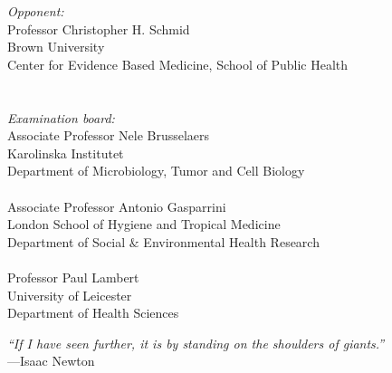\documentclass[11pt,a4paper,twoside,openany]{book}\usepackage{knitr}
\makeatletter
\def\cleardoublepage{\clearpage\if@twoside
\ifodd\c@page
\else\hbox{}\thispagestyle{empty}\newpage
\if@twocolumn\hbox{}\newpage\fi\fi\fi}
\makeatother
\begin{document}
\begin{minipage}[t]{7.25cm}
\singlespacing
{\small
\textit{Opponent:}\\
Professor Christopher H. Schmid \\
Brown University \\
Center for Evidence Based Medicine, School of Public Health \\
\\
\\
\textit{Examination board:}\\
Associate Professor Nele Brusselaers \\
Karolinska Institutet \\
Department of Microbiology, Tumor and Cell Biology \\
\\
Associate Professor Antonio Gasparrini \\
London School of Hygiene and Tropical Medicine \\
Department of Social $\&$ Environmental Health Research \\
\\
Professor Paul Lambert \\
University of Leicester \\
Department of Health Sciences \\
}
\end{minipage}
\cleardoublepage

%


\begin{flushright}
\null{}
\textit{``If I have seen further, it is by standing on the shoulders of giants.''} \\
---Isaac Newton
\null
\end{flushright}

\cleardoublepage 
\pagestyle{frontmatter}
\end{document}
